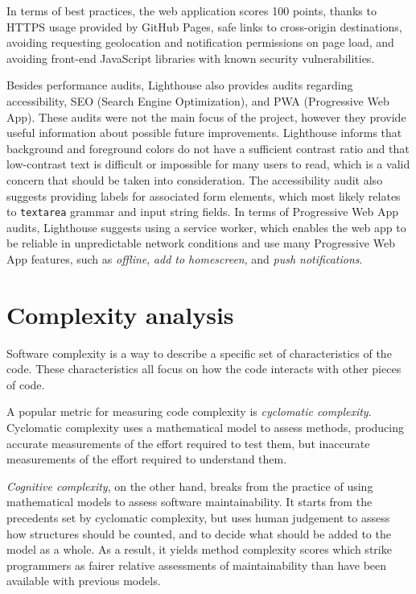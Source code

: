 \documentclass[english,bachelors,forcepolishlogotype]{wizthesis}
\begin{document}
In terms of best practices, the web application scores 100 points, thanks to
HTTPS usage provided by GitHub Pages, safe links to cross-origin destinations,
avoiding requesting geolocation and notification permissions on page load,
and avoiding front-end JavaScript libraries with known security vulnerabilities.

Besides performance audits, Lighthouse also provides audits regarding
accessibility, SEO (Search Engine Optimization), and PWA (Progressive Web App).
These audits were not the main focus of the project, however they provide useful
information about possible future improvements. Lighthouse informs that
background and foreground colors do not have a sufficient contrast ratio and
that low-contrast text is difficult or impossible for many users to read, which
is a valid concern that should be taken into consideration. The accessibility
audit also suggests providing labels for associated form elements, which most
likely relates to \texttt{textarea} grammar and input string fields. In terms of
Progressive Web App audits, Lighthouse suggests using a service worker, which
enables the web app to be reliable in unpredictable network conditions and use
many Progressive Web App features, such as \emph{offline}, \emph{add to
homescreen}, and \emph{push notifications}.

\newpage

\section{Complexity analysis}

Software complexity is a way to describe a specific set of characteristics of
the code. These characteristics all focus on how the code interacts with other
pieces of code.

A popular metric for measuring code complexity is \emph{cyclomatic complexity}.
Cyclomatic complexity uses a mathematical model to assess methods, producing
accurate measurements of the effort required to test them, but inaccurate
measurements of the effort required to understand them.

\emph{Cognitive complexity}, on the other hand, breaks from the practice of
using mathematical models to assess software maintainability. It starts from the
precedents set by cyclomatic complexity, but uses human judgement to assess how
structures should be counted, and to decide what should be added to the model as
a whole. As a result, it yields method complexity scores which strike
programmers as fairer relative assessments of maintainability than have been
available with previous models.
\end{document}
